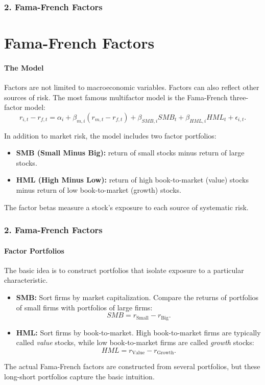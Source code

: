 \documentclass{beamer}
\begin{document}
\begin{frame}[t]
    \frametitle{2. Fama-French Factors}
    \section{Fama-French Factors}
    \framesubtitle{The Model}

    Factors are not limited to macroeconomic variables.  Factors can also reflect other sources of risk. The most famous multifactor model is the Fama-French three-factor model:
    \[
    r_{i,t}-r_{f,t}
    =
    \alpha_i
    +\beta_{m,i}(r_{m,t}-r_{f,t})
    +\beta_{SMB,i}SMB_t
    +\beta_{HML,i}HML_t
    +\epsilon_{i,t}.
    \]

    In addition to market risk, the model includes two factor portfolios:
    \begin{itemize}
        \item \textbf{SMB (Small Minus Big):} return of small stocks minus return of large stocks.
        \item \textbf{HML (High Minus Low):} return of high book-to-market (value) stocks minus return of low book-to-market (growth) stocks.
    \end{itemize}

    \vspace{0.5em}
    The factor betas measure a stock's exposure to each source of systematic risk.

\end{frame}


\begin{frame}[t]
    \frametitle{2. Fama-French Factors}
    \framesubtitle{Factor Portfolios}

    The basic idea is to construct portfolios that isolate exposure to a particular characteristic.
    
    \vspace{1em}
    
    \begin{itemize}
        \item \textbf{SMB:} Sort firms by market capitalization. Compare the returns of portfolios of small firms with portfolios of large firms:
        \[
            SMB = r_{\text{Small}}-r_{\text{Big}}.
        \]
        
        \item \textbf{HML:} Sort firms by book-to-market. High book-to-market firms are typically called \textit{value} stocks, while low book-to-market firms are called \textit{growth} stocks:
        \[
            HML = r_{\text{Value}}-r_{\text{Growth}}.
        \]
    \end{itemize}
    
    \vspace{0.5em}
    The actual Fama-French factors are constructed from several portfolios, but these long-short portfolios capture the basic intuition.

\end{frame}
\end{document}
